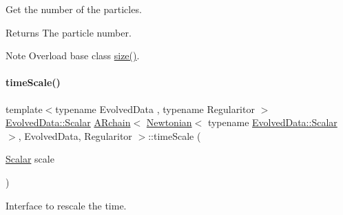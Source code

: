 Get the number of the particles. 

\begin{DoxyReturn}{Returns}
The particle number. 
\end{DoxyReturn}
\begin{DoxyNote}{Note}
Overload base class \mbox{\hyperlink{class_a_rchain_3_01_newtonian_3_01typename_01_evolved_data_1_1_scalar_01_4_00_01_evolved_data_00_01_regularitor_01_4_a928601b10d9a9e5ab02f36cf11efa263}{size()}}. 
\end{DoxyNote}
\mbox{\label{class_a_rchain_3_01_newtonian_3_01typename_01_evolved_data_1_1_scalar_01_4_00_01_evolved_data_00_01_regularitor_01_4_aa7aadb0b5ffcfebc759e4f091c4fc763}} 
\paragraph{\texorpdfstring{time\+Scale()}{timeScale()}}
{\footnotesize\ttfamily template$<$typename Evolved\+Data , typename Regularitor $>$ \\
\mbox{\hyperlink{class_a_rchain_a707e42a79e4744424a34c9007e84ee07}{Evolved\+Data\+::\+Scalar}} \mbox{\hyperlink{class_a_rchain}{A\+Rchain}}$<$ \mbox{\hyperlink{class_newtonian}{Newtonian}}$<$ typename \mbox{\hyperlink{class_a_rchain_a707e42a79e4744424a34c9007e84ee07}{Evolved\+Data\+::\+Scalar}} $>$, Evolved\+Data, Regularitor $>$\+::time\+Scale (\begin{DoxyParamCaption}\item[{\mbox{\hyperlink{class_a_rchain_3_01_newtonian_3_01typename_01_evolved_data_1_1_scalar_01_4_00_01_evolved_data_00_01_regularitor_01_4_a2c77dc1b58a25ac5c6ee95dd7809f693}{Scalar}}}]{scale }\end{DoxyParamCaption})}



Interface to rescale the time. 


